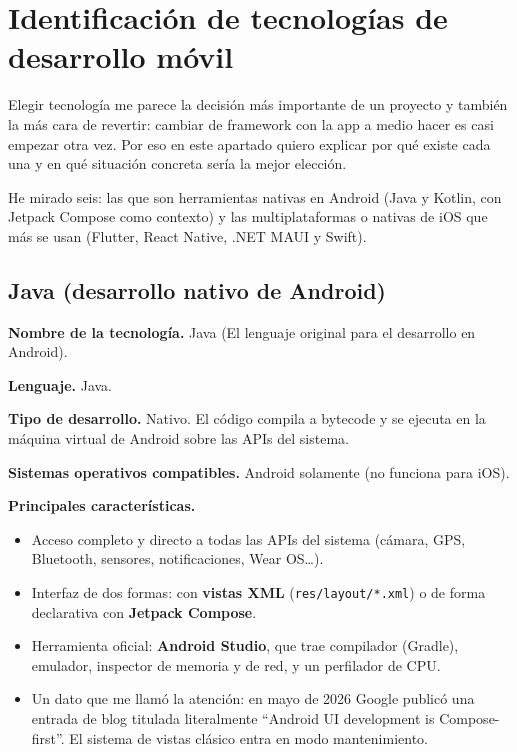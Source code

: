 \documentclass[11pt,a4paper]{article}
\newcommand{\code}[1]{\texttt{\color{navylight}#1}}
\newcommand{\campo}[1]{\textbf{\color{navy}#1}}
\begin{document}
	\section{Identificación de tecnologías de desarrollo móvil}
	
	Elegir tecnología me parece la decisión más importante de un proyecto y también la más cara de revertir: cambiar de framework con la app a medio hacer es casi empezar otra vez. Por eso en este apartado quiero explicar por qué existe cada una y en qué situación concreta sería la mejor elección.
	
	He mirado seis: las que son herramientas nativas en Android (Java y Kotlin, con Jetpack Compose como contexto) y las multiplataformas o nativas de iOS que más se usan (Flutter, React Native, .NET MAUI y Swift).
	
	\subsection{Java (desarrollo nativo de Android)}
	
  \campo{Nombre de la tecnología.} Java (El lenguaje original para el desarrollo en Android).
	
	\campo{Lenguaje.} Java.
	
	\campo{Tipo de desarrollo.} Nativo. El código compila a bytecode y se ejecuta en la máquina virtual de Android sobre las APIs del sistema.
	
	\campo{Sistemas operativos compatibles.} Android solamente (no funciona para iOS).
	
	\campo{Principales características.}
	\begin{itemize}[leftmargin=*,itemsep=0.2em,topsep=0.2em]
		\item Acceso completo y directo a todas las APIs del sistema (cámara, GPS, Bluetooth, sensores, notificaciones, Wear OS\ldots).
		\item Interfaz de dos formas: con \textbf{vistas XML} (\code{res/layout/*.xml}) o de forma declarativa con \textbf{Jetpack Compose}.
		\item Herramienta oficial: \textbf{Android Studio}, que trae compilador (Gradle), emulador, inspector de memoria y de red, y un perfilador de CPU.
		\item Un dato que me llamó la atención: en mayo de 2026 Google publicó una entrada de blog titulada literalmente \enquote{Android UI development is Compose-first}. El sistema de vistas clásico entra en modo mantenimiento.
	\end{itemize}
	
\end{document}
